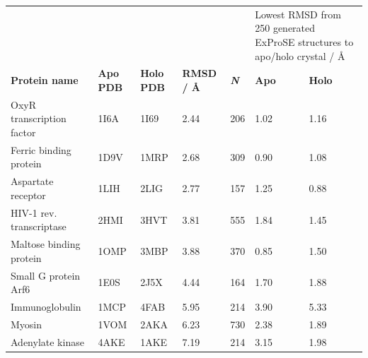 \begin{table}
\centering

\begin{footnotesize}
\begin{tabular}{ r r r r r l l }
\hline
      &       &       &       &       & \multicolumn{2}{p{3.5cm}}{Lowest RMSD from 250 generated ExProSE structures to apo/holo crystal / \AA} \\
\multicolumn{1}{l}{\textbf{Protein name}} & \multicolumn{1}{l}{\textbf{Apo PDB}} & \multicolumn{1}{l}{\textbf{Holo PDB}} & \multicolumn{1}{l}{\textbf{RMSD / \AA}} & \multicolumn{1}{l}{\textit{\textbf{N}}} & \textbf{Apo} & \textbf{Holo} \\
\hline
\multicolumn{1}{l}{OxyR transcription factor} & \multicolumn{1}{l}{1I6A} & \multicolumn{1}{l}{1I69} & \multicolumn{1}{l}{2.44} & \multicolumn{1}{l}{206} & 1.02  & 1.16 \\
\multicolumn{1}{l}{Ferric binding protein}    & \multicolumn{1}{l}{1D9V} & \multicolumn{1}{l}{1MRP} & \multicolumn{1}{l}{2.68} & \multicolumn{1}{l}{309} & 0.90  & 1.08 \\
\multicolumn{1}{l}{Aspartate receptor}        & \multicolumn{1}{l}{1LIH} & \multicolumn{1}{l}{2LIG} & \multicolumn{1}{l}{2.77} & \multicolumn{1}{l}{157} & 1.25  & 0.88 \\
\multicolumn{1}{l}{HIV-1 rev. transcriptase}  & \multicolumn{1}{l}{2HMI} & \multicolumn{1}{l}{3HVT} & \multicolumn{1}{l}{3.81} & \multicolumn{1}{l}{555} & 1.84  & 1.45 \\
\multicolumn{1}{l}{Maltose binding protein}   & \multicolumn{1}{l}{1OMP} & \multicolumn{1}{l}{3MBP} & \multicolumn{1}{l}{3.88} & \multicolumn{1}{l}{370} & 0.85  & 1.50 \\
\multicolumn{1}{l}{Small G protein Arf6}      & \multicolumn{1}{l}{1E0S} & \multicolumn{1}{l}{2J5X} & \multicolumn{1}{l}{4.44} & \multicolumn{1}{l}{164} & 1.70  & 1.88 \\
\multicolumn{1}{l}{Immunoglobulin}            & \multicolumn{1}{l}{1MCP} & \multicolumn{1}{l}{4FAB} & \multicolumn{1}{l}{5.95} & \multicolumn{1}{l}{214} & 3.90  & 5.33 \\
\multicolumn{1}{l}{Myosin}                    & \multicolumn{1}{l}{1VOM} & \multicolumn{1}{l}{2AKA} & \multicolumn{1}{l}{6.23} & \multicolumn{1}{l}{730} & 2.38  & 1.89 \\
\multicolumn{1}{l}{Adenylate kinase}          & \multicolumn{1}{l}{4AKE} & \multicolumn{1}{l}{1AKE} & \multicolumn{1}{l}{7.19} & \multicolumn{1}{l}{214} & 3.15  & 1.98 \\

\end{tabular}
\end{footnotesize}
\end{table}
